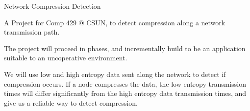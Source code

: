 Network Compression Detection

A Project for Comp 429 @ C\-S\-U\-N, to detect compression along a network transmission path.

The project will proceed in phases, and incrementally build to be an application suitable to an uncoperative environment.

We will use low and high entropy data sent along the network to detect if compression occurs. If a node compresses the data, the low entropy transmission times will differ significantly from the high entropy data transmission times, and give us a reliable way to detect compression. 